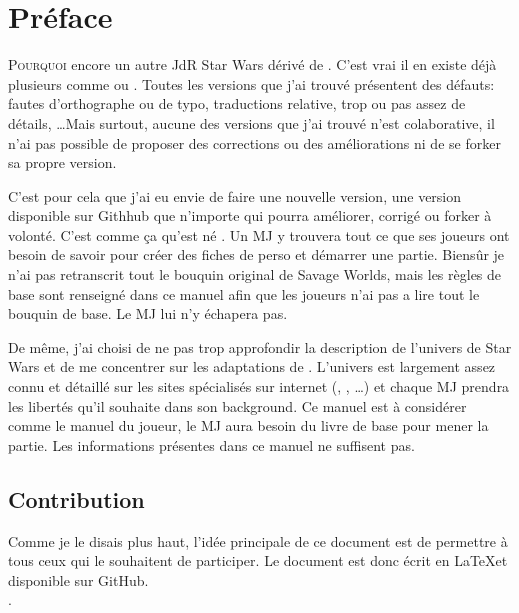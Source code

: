 \onecolumn
\section{Préface}

\lettrine{P}{ourquoi} encore un autre JdR {\jedifont Star Wars} dérivé de . C'est vrai il en existe déjà plusieurs comme  ou . Toutes les versions que j'ai trouvé présentent des défauts: fautes d'orthographe ou de typo, traductions relative, trop ou pas assez de détails, \ldots Mais surtout, aucune des versions que j'ai trouvé n'est colaborative, il n'ai pas possible de proposer des corrections ou des améliorations ni de se forker sa propre version.

C'est pour cela que j'ai eu envie de faire une nouvelle version, une version disponible sur Githhub que n'importe qui pourra améliorer, corrigé ou forker à volonté. C'est comme ça qu'est né {\jedifont \doctitle}. Un MJ y trouvera tout ce que ses joueurs ont besoin de savoir pour créer des fiches de perso et démarrer une partie. Biensûr je n'ai pas retranscrit tout le bouquin original de Savage Worlds, mais les règles de base sont renseigné dans ce manuel afin que les joueurs n'ai pas a lire tout le bouquin de base. Le MJ lui n'y échapera pas.

De même, j'ai choisi de ne pas trop approfondir la description de l'univers de Star Wars et de me concentrer sur les adaptations de . L'univers est largement assez connu et détaillé sur les sites spécialisés sur internet (, , \ldots) et chaque MJ prendra les libertés qu'il souhaite dans son background. Ce manuel est à considérer comme le manuel du joueur, le MJ aura besoin du livre de base  pour mener la partie. Les informations présentes dans ce manuel ne suffisent pas.

\subsection{Contribution}
Comme je le disais plus haut, l'idée principale de ce document est de permettre à tous ceux qui le souhaitent de participer. Le document est donc écrit en \LaTeX et disponible sur GitHub.\\
\cite{website:jdrp-starwars-reloaded}.

\twocolumn